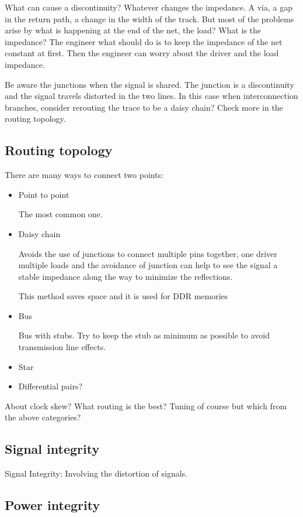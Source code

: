 \documentclass[12pt]{article}
\begin{document}
What can cause a discontinuity? Whatever changes the impedance. A via, a gap in the return path, a change in the width of the track. But most of the problems arise by what is happening at the end of the net, the load? What is the impedance? The engineer what should do is to keep the impedance of the net constant at first. Then the engineer can worry about the driver and the load impedance.

Be aware the junctions when the signal is shared. The junction is a discontinuity and the signal travels distorted in the two lines. In this case when interconnection branches, consider rerouting the trace to be a daisy chain? Check more in the routing topology.

\subsection{Routing topology}

There are many ways to connect two points:

\begin{itemize}
	\item Point to point
	
The most common one.
	\item Daisy chain
	
Avoids the use of junctions to connect multiple pins together, one driver multiple loads and the avoidance of junction can help to see the signal a stable impedance along the way to minimize the reflections.

This method saves space and it is used for DDR memories
	\item Bus
	
Bus with stubs. Try to keep the stub as minimum as possible to avoid transmission line effects.
	\item Star
	\item Differential pairs?
\end{itemize}

About clock skew? What routing is the best? Tuning of course but which from the above categories?

\subsection{Signal integrity}

Signal Integrity: Involving the distortion of signals.

\subsection{Power integrity}
\end{document}
